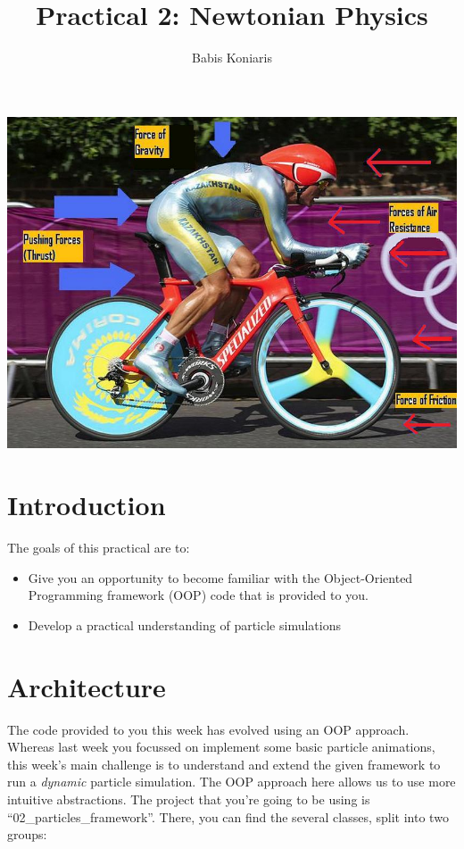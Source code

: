 \documentclass[12pt]{article}
\title{\textbf{Practical 2: Newtonian Physics}}
\author{Babis Koniaris}
\date{}
\begin{document}
\maketitle

\begin{center}
\includegraphics[width=\textwidth,height=\textheight,keepaspectratio]{p2-teaser.png}
\end{center}
\pagebreak

\section*{Introduction}

The goals of this practical are to:

\begin{itemize}
\item Give you an opportunity to become familiar with the Object-Oriented Programming framework (OOP) code that is provided to you.
\item Develop a practical understanding of particle simulations
\end{itemize}

\section*{Architecture}

The code provided to you this week has evolved using an OOP approach. Whereas last week you focussed on implement some basic particle animations, this week's main challenge is to understand and extend the given framework to run a \emph{dynamic} particle simulation. The OOP approach here allows us to use more intuitive abstractions. The project that you're going to be using is ``02\_particles\_framework''. There, you can find the several classes, split into two groups:
\end{document}
